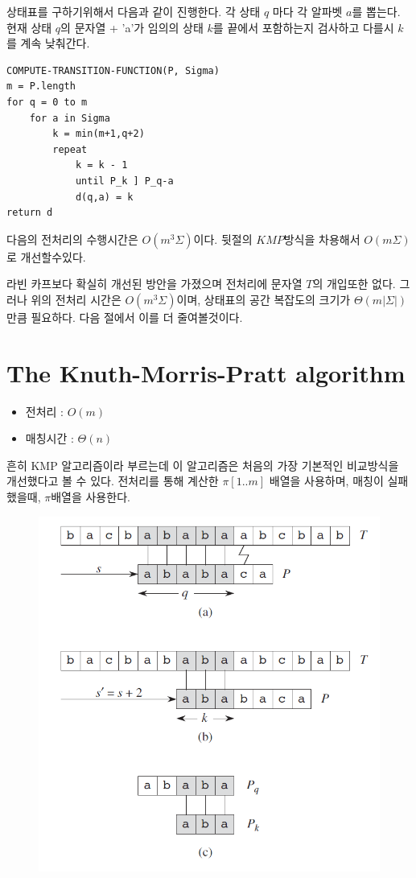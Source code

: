 상태표를 구하기위해서 다음과 같이 진행한다.
각 상태 $q$ 마다 각 알파벳 $a$를 뽑는다.
현재 상태 $q$의 문자열 + 'a'가 임의의 상태 $k$를 끝에서 포함하는지 검사하고 다를시 $k$를 계속 낮춰간다.

\begin{lstlisting}[style = CStyle]
COMPUTE-TRANSITION-FUNCTION(P, Sigma)
m = P.length
for q = 0 to m
    for a in Sigma
        k = min(m+1,q+2)
        repeat 
            k = k - 1
            until P_k ] P_q-a
            d(q,a) = k
return d
\end{lstlisting}



다음의 전처리의 수행시간은  $O(m^3 \Sigma)$이다.
뒷절의 $KMP$방식을 차용해서 $O(m \Sigma)$로 개선할수있다.


라빈 카프보다 확실히 개선된 방안을 가졌으며 전처리에 문자열 $T$의 개입또한 없다. 그러나 위의 전처리 시간은 $O(m^3 \Sigma)$이며, 상태표의 공간 복잡도의 크기가 $\Theta(m|\Sigma|)$만큼 필요하다.
다음 절에서 이를 더 줄여볼것이다.






\section{The Knuth-Morris-Pratt algorithm}

\begin{itemize}
    \item 전처리 : $O(m)$
    \item 매칭시간 : $\Theta(n)$
\end{itemize}


흔히 KMP 알고리즘이라 부르는데 이 알고리즘은 처음의 가장 기본적인 비교방식을 개선했다고 볼 수 있다. 전처리를 통해 계산한 $\pi[1..m]$ 배열을 사용하며, 매칭이 실패했을때, $\pi$배열을 사용한다.
\newpage
\begin{figure}[h!]
    \centering
    \includegraphics[scale=0.7]{pic3.PNG}
\end{figure}

